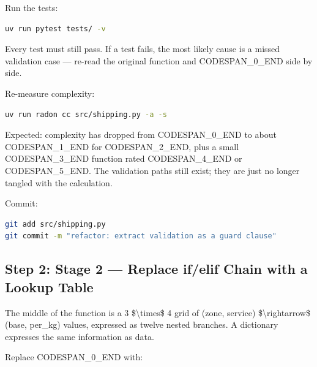 \documentclass[11pt,a4paper]{book}
\begin{document}
Run the tests:

\begin{lstlisting}[language=Bash]
uv run pytest tests/ -v
\end{lstlisting}

Every test must still pass. If a test fails, the most likely cause is a missed validation case --- re-read the original function and CODESPAN\_0\_END side by side.

Re-measure complexity:

\begin{lstlisting}[language=Bash]
uv run radon cc src/shipping.py -a -s
\end{lstlisting}

Expected: complexity has dropped from CODESPAN\_0\_END to about CODESPAN\_1\_END for CODESPAN\_2\_END, plus a small CODESPAN\_3\_END function rated CODESPAN\_4\_END or CODESPAN\_5\_END. The validation paths still exist; they are just no longer tangled with the calculation.

Commit:

\begin{lstlisting}[language=Bash]
git add src/shipping.py
git commit -m "refactor: extract validation as a guard clause"
\end{lstlisting}

\medskip

\subsection{Step 2: Stage 2 --- Replace if/elif Chain with a Lookup Table}

The middle of the function is a 3 \$\textbackslash{}times\$ 4 grid of (zone, service) \$\textbackslash{}rightarrow\$ (base, per\_kg) values, expressed as twelve nested branches. A dictionary expresses the same information as data.

Replace CODESPAN\_0\_END with:
\end{document}
